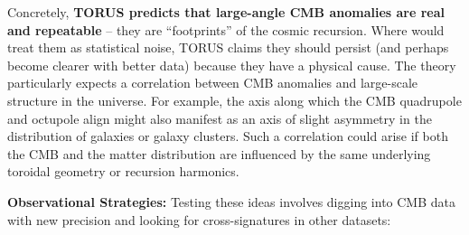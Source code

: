 \documentclass[]{article}
\begin{document}
Concretely, \textbf{TORUS predicts that large-angle CMB anomalies are
real and repeatable} -- they are ``footprints'' of the cosmic recursion.
Where \LambdaCDM would treat them as statistical noise, TORUS claims they
should persist (and perhaps become clearer with better data) because
they have a physical cause​. The theory particularly expects a
correlation between CMB anomalies and large-scale structure in the
universe​. For example, the axis along which the CMB quadrupole and
octupole align might also manifest as an axis of slight asymmetry in the
distribution of galaxies or galaxy clusters. Such a correlation could
arise if both the CMB and the matter distribution are influenced by the
same underlying toroidal geometry or recursion harmonics.

\textbf{Observational Strategies:} Testing these ideas involves digging
into CMB data with new precision and looking for cross-signatures in
other datasets:
\end{document}
